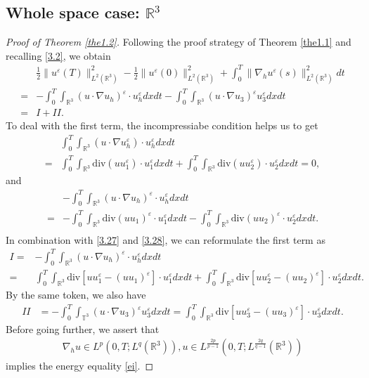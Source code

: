 \documentclass[11pt]{article}
\theoremstyle{plain}\newtheorem{definition}{Definition}[section]
\theoremstyle{definition}\newtheorem{theorem}{Theorem}[section]
\theoremstyle{plain}\newtheorem{lemma}[theorem]{Lemma}
\theoremstyle{plain}\newtheorem{coro}[theorem]{Corollary}
\theoremstyle{plain}\newtheorem{prop}[theorem]{Proposition}
\theoremstyle{remark}\newtheorem{remark}{Remark}[section]
\newcommand{\s}{\mathrm{div}}
\newcommand{\be}{\begin{equation}}
\newcommand{\ee}{\end{equation}}
\newcommand{\ba}{\begin{aligned}}
\newcommand{\ea}{\end{aligned}}
\newcommand{\f}{\frac}
\numberwithin{equation}{section}
\begin{document}
\subsection{Whole space case: $\mathbb{R}^3$}\label{subsec2}
\begin{proof}[Proof of Theorem \ref{the1.2}]
Following the proof strategy of Theorem \ref{the1.1} and recalling \eqref{3.2}, we obtain
\begin{equation}\ba\label{3.26}
	&\f12\|u ^{\varepsilon}(T)\|^{2}_{L^{2}(\mathbb{R}^3)}
	-\f12\|{u }^{\varepsilon}(0) \|^{2}_{L^{2}(\mathbb{R}^3)} +\int_{0}^{T}\|\nabla_{h}{u }^{\varepsilon}(s) \|^{2}_{L^{2}(\mathbb{R}^3)} dt \\=& - \int_{0}^{T}\int_{\mathbb{R}^{3}} (u\cdot \nabla u_{h})^{\varepsilon}\cdot u_{h}^{\varepsilon} dxdt - \int_{0}^{T}\int_{\mathbb{R}^{3}} (u\cdot \nabla u_{3})^{\varepsilon}u_{3}^{\varepsilon} dxdt\\
	=&I+II.\ea\end{equation}
To deal with the first term,  the incompressiabe condition  helps us to get
\be\label{3.27}\ba &\int_{0}^{T}\int_{\mathbb{R}^{3}} (u\cdot \nabla u_{h}^{\varepsilon})\cdot u_{h}^{\varepsilon} dxdt\\
=& \int_{0}^{T}\int_{\mathbb{R}^{3}}\s(u u_{1}^{\varepsilon})\cdot u_{1}^{\varepsilon} dxdt+\int_{0}^{T}\int_{\mathbb{R}^{3}}\s(u u_{2}^{\varepsilon})\cdot u_{2}^{\varepsilon} dxdt=0,\ea\ee
and
\be\label{3.28}\ba
 &- \int_{0}^{T}\int_{\mathbb{R}^{3}} (u\cdot \nabla u_{h})^{\varepsilon}\cdot u_{h}^{\varepsilon} dxdt\\
= & -\int_{0}^{T}\int_{\mathbb{R}^{3}} \s(u u_{1})^{\varepsilon}\cdot u_{1}^{\varepsilon} dxdt-\int_{0}^{T}\int_{\mathbb{R}^{3}} \s(u u_{2})^{\varepsilon}\cdot u_{2}^{\varepsilon} dxdt.\\
\ea\ee
In combination with \eqref{3.27} and \eqref{3.28}, we can reformulate the first term as
\be\label{3.29}\ba
 I=&- \int_{0}^{T}\int_{\mathbb{R}^{3}} (u\cdot \nabla u_{h})^{\varepsilon}\cdot u_{h}^{\varepsilon} dxdt\\
 =&\int_{0}^{T}\int_{\mathbb{R}^{3}} \s[u u_{1} ^{\varepsilon}-(u u_{1})^{\varepsilon}]\cdot u_{1}^{\varepsilon} dxdt+\int_{0}^{T}\int_{\mathbb{R}^{3}} \s[u u_{2} ^{\varepsilon}-(u u_{2})^{\varepsilon}]\cdot u_{2}^{\varepsilon} dxdt.
\ea\ee
By the same token, we also have
\be\label{3.30}\ba
II&= - \int_{0}^{T}\int_{\mathbb{T}^{3}} (u\cdot \nabla u_{3})^{\varepsilon}u_{3}^{\varepsilon} dxdt=\int_0^T\int_{\mathbb{R}^3}\s [uu_3^\varepsilon-(u u_3)^\varepsilon]\cdot u_3^\varepsilon dxdt.
\ea\ee
Before going further, we assert that
\be\label{3.31}
\ba
\nabla_{h}u\in L^{p}(0,T;L^{ q}( \mathbb{R}^{3})),u\in L^{\f{2p}{p-1}}(0,T;L^{ \f{2q}{q-1}}( \mathbb{R}^{3}))\ea\ee
implies the energy equality \eqref{ei}.


\end{proof}
\end{document}
